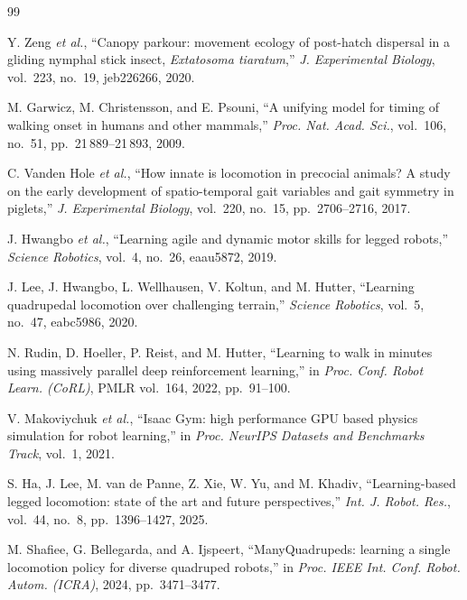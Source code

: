 \documentclass[a4paper, 10pt, conference]{ieeeconf}
\begin{document}
\begin{thebibliography}{99}

 Y. Zeng \emph{et al.}, ``Canopy parkour: movement ecology of post-hatch
dispersal in a gliding nymphal stick insect, \emph{Extatosoma tiaratum},''
\emph{J. Experimental Biology}, vol.~223, no.~19, jeb226266, 2020.

 M. Garwicz, M. Christensson, and E. Psouni, ``A unifying
model for timing of walking onset in humans and other mammals,'' \emph{Proc. Nat.
Acad. Sci.}, vol.~106, no.~51, pp.~21\,889--21\,893, 2009.

 C. Vanden Hole \emph{et al.}, ``How innate is
locomotion in precocial animals? A study on the early development of
spatio-temporal gait variables and gait symmetry in piglets,'' \emph{J.
Experimental Biology}, vol.~220, no.~15, pp.~2706--2716, 2017.

 J. Hwangbo \emph{et al.}, ``Learning agile and dynamic motor skills
for legged robots,'' \emph{Science Robotics}, vol.~4, no.~26, eaau5872, 2019.

 J. Lee, J. Hwangbo, L. Wellhausen, V. Koltun, and M. Hutter,
``Learning quadrupedal locomotion over challenging terrain,'' \emph{Science
Robotics}, vol.~5, no.~47, eabc5986, 2020.

 N. Rudin, D. Hoeller, P. Reist, and M. Hutter, ``Learning to
walk in minutes using massively parallel deep reinforcement learning,'' in
\emph{Proc. Conf. Robot Learn. (CoRL)}, PMLR vol.~164, 2022, pp.~91--100.

 V. Makoviychuk \emph{et al.}, ``Isaac Gym: high
performance GPU based physics simulation for robot learning,'' in \emph{Proc.
NeurIPS Datasets and Benchmarks Track}, vol.~1, 2021.

 S. Ha, J. Lee, M. van de Panne, Z. Xie, W. Yu, and M. Khadiv,
``Learning-based legged locomotion: state of the art and future perspectives,''
\emph{Int. J. Robot. Res.}, vol.~44, no.~8, pp.~1396--1427, 2025.

 M. Shafiee, G. Bellegarda, and A. Ijspeert,
``ManyQuadrupeds: learning a single locomotion policy for diverse quadruped
robots,'' in \emph{Proc. IEEE Int. Conf. Robot. Autom. (ICRA)}, 2024,
pp.~3471--3477.


\end{thebibliography}
\end{document}
